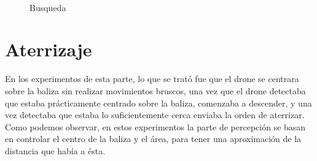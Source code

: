 \begin{figure}[H]
 \centering
	\\
 \caption{Busqueda}
 \label{f:Busqueda con el drone real}
\end{figure}


\section{Aterrizaje}

\hspace{1cm} En los experimentos de esta parte, lo que se trat\'o fue que el drone se centrara sobre la baliza sin realizar movimientos bruscos, una vez que el drone detectaba que estaba pr\'acticamente centrado sobre la baliza, comenzaba a descender, y una vez detectaba que estaba lo suficientemente cerca enviaba la orden de aterrizar. Como podemos observar, en estos experimentos la parte de percepci\'on se basan en controlar el centro de la baliza y el \'area, para tener una aproximaci\'on de la distancia que hab\'ia a \'esta. 


